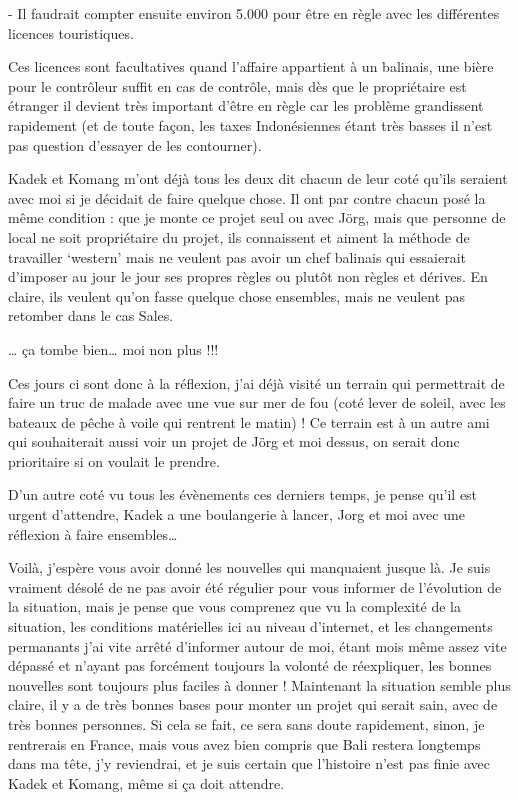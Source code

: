 - Il faudrait compter ensuite environ 5.000 pour être en règle avec les différentes licences touristiques.

Ces licences sont facultatives quand l’affaire appartient à un balinais, une bière pour le contrôleur suffit en cas de contrôle, mais dès que le propriétaire est étranger il devient très important d’être en règle car les problème grandissent rapidement (et de toute façon, les taxes Indonésiennes étant très basses il n’est pas question d’essayer de les contourner).

Kadek et Komang m’ont déjà tous les deux dit chacun de leur coté qu’ils seraient avec moi si je décidait de faire quelque chose. Il ont par contre chacun posé la même condition : que je monte ce projet seul ou avec Jörg, mais que personne de local ne soit propriétaire du projet, ils connaissent et aiment la méthode de travailler ‘western’ mais ne veulent pas avoir un chef balinais qui essaierait d’imposer au jour le jour ses propres règles ou plutôt non règles et dérives. En claire, ils veulent qu’on fasse quelque chose ensembles, mais ne veulent pas retomber dans le cas Sales.

… ça tombe bien… moi non plus !!!

Ces jours ci sont donc à la réflexion, j’ai déjà visité un terrain qui permettrait de faire un truc de malade avec une vue sur mer de fou (coté lever de soleil, avec les bateaux de pêche à voile qui rentrent le matin) ! Ce terrain est à un autre ami qui souhaiterait aussi voir un projet de Jörg et moi dessus, on serait donc prioritaire si on voulait le prendre.

D’un autre coté vu tous les évènements ces derniers temps, je pense qu’il est urgent d’attendre, Kadek a une boulangerie à lancer, Jorg et moi avec une réflexion à faire ensembles…

Voilà, j’espère vous avoir donné les nouvelles qui manquaient jusque là. Je suis vraiment désolé de ne pas avoir été régulier pour vous informer de l’évolution de la situation, mais je pense que vous comprenez que vu la complexité de la situation, les conditions matérielles ici au niveau d’internet, et les changements permanants j’ai vite arrêté d’informer autour de moi, étant mois même assez vite dépassé et n’ayant pas forcément toujours la volonté de réexpliquer, les bonnes nouvelles sont toujours plus faciles à donner ! Maintenant la situation semble plus claire, il y a de très bonnes bases pour monter un projet qui serait sain, avec de très bonnes personnes. Si cela se fait, ce sera sans doute rapidement, sinon, je rentrerais en France, mais vous avez bien compris que Bali restera longtemps dans ma tête, j’y reviendrai, et je suis certain que l’histoire n’est pas finie avec Kadek et Komang, même si ça doit attendre.

